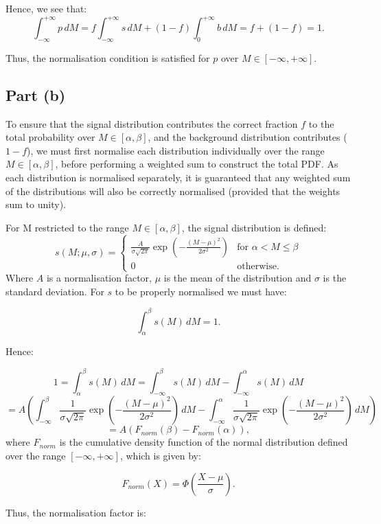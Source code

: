 \documentclass{article}
\begin{document}
Hence, we see that:
\[ 
\int_{-\infty}^{+\infty} p \, dM = 
f\int_{-\infty}^{+\infty} s \, dM + 
(1-f)\int_{0}^{+\infty} b \, dM =
f + (1-f) = 1.
\]

Thus, the normalisation condition is satisfied for $p$ over $M \in [-\infty, +\infty]$.

\subsection*{Part (b)}

To ensure that the signal distribution contributes the correct fraction $f$ to the total probability over $M \in [\alpha, \beta]$, and the background distribution contributes ($1-f$), we must first normalise each distribution individually over the range $M \in [\alpha, \beta]$, before performing a weighted sum to construct the total PDF. As each distribution is normalised separately, it is guaranteed that any weighted sum of the distributions will also be correctly normalised (provided that the weights sum to unity). 

For M restricted to the range $M \in [\alpha, \beta]$, the signal distribution is defined:
\[
s(M; \mu, \sigma) =
\begin{cases} 
\frac{A}{\sigma\sqrt{2\pi}} \exp\left(-\frac{(M - \mu)^2}{2\sigma^2}\right) 
& \text{for } \alpha < M \leq \beta \\
0 & \text{otherwise}.
\end{cases} 
\]
Where $A$ is a normalisation factor, $\mu$ is the mean of the distribution and $\sigma$ is the standard deviation. For $s$ to be properly normalised we must have:

\[
\int_{\alpha}^{\beta} s(M) \, dM = 1.
\]

Hence:

\[
1 = \int_{\alpha}^{\beta} s(M) \, dM 
= 
\int_{-\infty}^{\beta} s(M) \, dM - \int_{-\infty}^{\alpha} s(M) \, dM
\]
\[
= A \left( 
\int_{-\infty}^{\beta} \frac{1}{\sigma\sqrt{2\pi}} \exp\left(-\frac{(M - \mu)^2}{2\sigma^2}\right) \, dM - 
\int_{-\infty}^{\alpha} \frac{1}{\sigma\sqrt{2\pi}} \exp\left(-\frac{(M - \mu)^2}{2\sigma^2}\right) \, dM
\right)
\]
\[
= A (F_{norm}(\beta) - F_{norm}(\alpha)),
\]
where $F_{norm}$ is the cumulative density function of the normal distribution defined over the range $[-\infty, +\infty]$, which is given by:

\[
F_{norm}(X) = \Phi(\frac{X-\mu}{\sigma}).
\]

Thus, the normalisation factor is:
\end{document}

